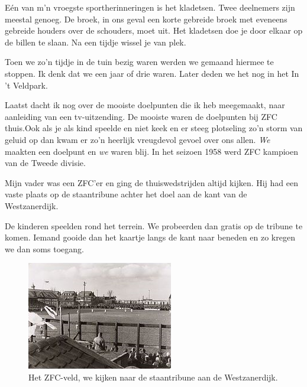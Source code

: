 \documentclass[12pt,twoside, openright]{memoir}
\begin{document}
Eén van m’n vroegste sportherinneringen is het kladetsen. Twee deelnemers zijn meestal genoeg. De broek, in ons geval een korte gebreide broek met eveneens gebreide houders over de schouders, moet uit. Het kladetsen doe je door elkaar op de billen te slaan. Na een tijdje wissel je van plek. 

Toen we zo’n tijdje in de tuin bezig waren werden we gemaand hiermee te stoppen. Ik denk dat we een jaar of drie waren. Later deden we het nog in het In ’t Veldpark.

Laatst dacht ik nog over de mooiste doelpunten die ik heb meegemaakt, naar aanleiding van een tv-uitzending. De mooiste waren de doelpunten bij ZFC thuis.Ook als je als kind speelde en niet keek en er steeg plotseling zo’n storm van geluid op dan kwam er zo’n heerlijk vreugdevol gevoel over ons allen. \emph{We} maakten een doelpunt en \emph{we} waren blij. In het seizoen 1958 werd ZFC kampioen van de Tweede divisie.

Mijn vader was een ZFC’er en ging de thuiswedstrijden altijd kijken. Hij had een vaste plaats op de staantribune achter het doel aan de kant van de Westzanerdijk. 

De kinderen speelden rond het terrein. We probeerden dan gratis op de tribune te komen. Iemand gooide dan het kaartje langs de kant naar beneden en zo kregen we dan soms toegang. 

\begin{figure}
\includegraphics[width=\textwidth]{img/ch11/image}
\caption*{\footnotesize Het ZFC-veld, we kijken naar de staantribune aan de Westzanerdijk.}
\end{figure}
\end{document}
